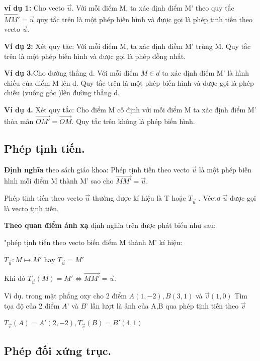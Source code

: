 \documentclass[12pt,oneside,a4paper,reqno]{book}
\begin{document}
\textbf{ví dụ 1:} Cho vecto $\overrightarrow{u}$. Với mỗi điểm M, ta xác định điểm M’ theo quy tắc $\overrightarrow{MM'} =\overrightarrow{u}$
quy tắc trên là một phép biến hình và được gọi là phép tinh tiến theo vecto $\overrightarrow{u}$.

\textbf{Ví dụ 2:} Xét quy tăc: Với mỗi điểm M, ta xác định điềm M’ trùng M. Quy tắc trên là một phép biến hình và được gọi là phép đồng nhất.

\textbf{Ví dụ 3.}Cho đường thẳng d. Với mỗi điểm $M\in d$ ta xác định điểm M’ là hình chiếu của  điểm M lên d. Quy tắc trên là một phép biến hình và được gọi là phép chiếu (vuông góc )lên đường thẳng d.

\textbf{Ví dụ 4.} Xét quy tắc: Cho điểm M cố định với mỗi điểm M ta xác định điểm M’ thỏa mãn $\overrightarrow{OM'}=\overrightarrow{OM}$. Quy tắc trên không là phép biến hình.

\subsection{Phép tịnh tiến.}

    \textbf{Định nghĩa }theo sách giáo khoa: Phép tịnh tiến theo vecto $\overrightarrow{u}$ là một phép biến hình  mỗi điểm M thành M’ sao cho $\overrightarrow{MM'}=\overrightarrow{u}.$

Phép tịnh tiến theo vecto $\overrightarrow{u}$ thường được kí hiệu là T hoặc $T_{\overrightarrow{u}}$ . Véctơ $\overrightarrow{u}$  được gọi là vecto tịnh tiến.

\textbf{Theo quan điểm ánh xạ }định nghĩa trên được phát biểu như sau:

"phép tịnh tiến theo vecto  biến điểm M thành M’ kí hiệu:

$T_{\overrightarrow{u}}:M \mapsto M'$ hay $T_{\overrightarrow{u}}=M'$

Khi đó $T_{\overrightarrow{u}}(M)=M' \Leftrightarrow \overrightarrow{MM'}=\overrightarrow{u}.$


Ví dụ. trong mặt phẳng oxy cho 2 điểm $A(1,-2), B(3,1)$ và $\overrightarrow{v}(1,0)$ Tìm tọa độ của 2 điểm $A’$ và $B$’ lần lượt là ảnh của A,B qua phép tịnh tiến theo $\overrightarrow{v}$   

$T_{\overrightarrow{v}}(A)=A'(2,-2),T_{\overrightarrow{v}}(B)=B'(4,1)$

\subsection{ Phép đối xứng trục.}
\end{document}
